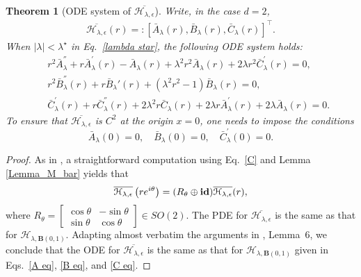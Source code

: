 \documentclass[11pt,a4paper,english,reqno]{amsart}
\theoremstyle{plain}
\newtheorem{theorem}[definition]{Theorem}
\newcommand{\e}{\epsilon}
\newcommand{\1}{\mathbbm{1}}
\newcommand{\B}{\mathbf{B}}
\begin{document}
\begin{theorem}[ODE system of $\overline{\mathcal{H}_{\lambda,\e}}$]\label{Thm_F_bar}
Write, in the case $d=2$,
\begin{align*}
    \overline{\mathcal{H}_{\lambda,\e}}(r) =: \left[\bar{A}_\lambda(r),\bar{B}_{\lambda}(r), \bar{C}_{\lambda}(r)\right]^\top.
\end{align*}
When $|\lambda|<\lambda^\star$ in Eq.~\eqref{lambda star}, the following ODE system holds:
\begin{eqnarray}
&&r^{2}\bar{A}_{\lambda}^{''} + r\bar{A}_{\lambda}^{'}(r) -\bar{A}_{\lambda}(r) + \lambda^{2}r^{2}\bar{A}_{\lambda}(r) + 2\lambda r^{2}\bar{C}_{\lambda}^{'}(r) = 0,\label{A eq}\\
&&r^2\bar{B}_{\lambda}^{''}(r) + r\bar{B}_{\lambda}'(r) + (\lambda^2r^2-1)\bar{B}_{\lambda}(r)= 0,\label{B eq}\\
&&\bar{C}^{'}_{\lambda}(r) + r\bar{C}^{''}_{\lambda}(r) + 2\lambda^{2}r\bar{C}_{\lambda}(r) + 2\lambda r \bar{A}^{'}_{\lambda}(r) + 2\lambda \bar{A}_{\lambda}(r)= 0.\label{C eq}
\end{eqnarray}
To ensure that $\overline{\mathcal{H}_{\lambda,\e}}$ is $C^2$ at the origin $x=0$, one needs to impose the conditions
\begin{equation}
\label{boundary conditions, ABC}
\bar{A}_{\lambda}(0) = 0,\quad\bar{B}_{\lambda}(0) = 0,\quad\bar{C}^{'}_{\lambda}(0) = 0.
\end{equation}
\end{theorem}
\begin{proof}
As in \cite{boedihardjo2021expected}, a straightforward computation using Eq.~\eqref{C} and Lemma \ref{Lemma_M_bar} yields that 
\begin{equation}\label{F sep var}
\overline{\mathcal{H}_{\lambda,\e}}\left(r e^{i\theta}\right) = (R_{\theta} \oplus {\bf id})   \overline{\mathcal{H}_{\lambda,\e}}(r),
\end{equation}
where $R_\theta=\begin{bmatrix}
\cos\theta&-\sin\theta\\
\sin\theta & \cos\theta
\end{bmatrix}\in SO(2)$. The PDE for $\overline{\mathcal{H}_{\lambda,\e}}$ is the same as that for $\mathcal{H}_{\lambda,\B(0, 1)}$. %
Adapting almost verbatim the arguments in \cite{boedihardjo2021expected}, Lemma~6, we conclude that the ODE for $\overline{\mathcal{H}_{\lambda,\e}}$ is the same as that for $\mathcal{H}_{\lambda,\B(0, 1)}$ given in Eqs.~\eqref{A eq},  \eqref{B eq},  and \eqref{C eq}. \end{proof}
\end{document}
